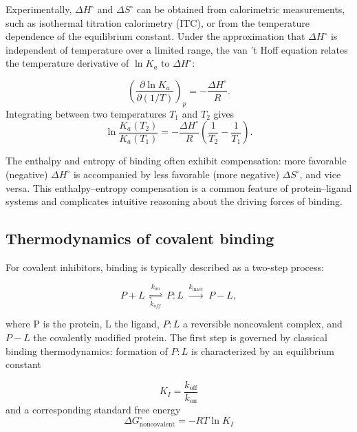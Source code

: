 \documentclass[12pt]{article}
\begin{document}
Experimentally, $\Delta H^\circ$ and $\Delta S^\circ$ can be obtained from calorimetric measurements, such as isothermal titration calorimetry (ITC), or from the temperature dependence of the equilibrium constant.\cite{CH3_holdgate2005} Under the approximation that $\Delta H^\circ$ is independent of temperature over a limited range, the van 't Hoff equation relates the temperature derivative of $\ln K_a$ to $\Delta H^\circ$:

\begin{equation}
\left( \frac{\partial \ln K_a}{\partial (1/T)} \right)_p = -\frac{\Delta H^\circ}{R}.
\label{vant_hoff}
\end{equation}
Integrating between two temperatures $T_1$ and $T_2$ gives
\[
\ln \frac{K_a(T_2)}{K_a(T_1)} = -\frac{\Delta H^\circ}{R} \left( \frac{1}{T_2} - \frac{1}{T_1} \right).
\]

The enthalpy and entropy of binding often exhibit compensation: more favorable (negative) $\Delta H^\circ$ is accompanied by less favorable (more negative) $\Delta S^\circ$, and vice versa.\cite{CH3_reynolds2011} This enthalpy--entropy compensation is a common feature of protein--ligand systems and complicates intuitive reasoning about the driving forces of binding.


\subsection{Thermodynamics of covalent binding}\label{sec:covalent_binding}

For covalent inhibitors, binding is typically described as a two-step process:\cite{CH3_Strelow2017,CH3_sutanto2020}

\begin{equation}
P + L \;\underset{k_{\!off}}{\overset{k_{\!on}}{\rightleftharpoons}}\; P\!:\!L
\;\xrightarrow{k_{\text{inact}}}\;
P\!-\!L,
\label{eq:covbind_eq1}
\end{equation}

where P is the protein, L the ligand, $P\!:\!L$ a reversible noncovalent complex, and $P\!-\!L$ the covalently modified protein. The first step is governed by classical binding thermodynamics: formation of $P\!:\!L$ is characterized by an equilibrium constant

\begin{equation}
K_I = \frac{k_{\text{off}}}{k_{\text{on}}}
\label{covbind_eq2a}
\end{equation}
and a corresponding standard free energy
\begin{equation}
\Delta G^\circ_{\text{noncovalent}} = -RT \ln K_I
\label{eq:covbind_eq2b}
\end{equation}
\end{document}
